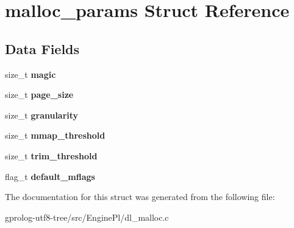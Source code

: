 \hypertarget{structmalloc__params}{}\section{malloc\+\_\+params Struct Reference}
\label{structmalloc__params}
\subsection*{Data Fields}
\begin{DoxyCompactItemize}
\item 
size\+\_\+t {\bfseries magic}\hypertarget{structmalloc__params_a7034fc9c71af2cc5ba9cd079effdf5a8}{}\label{structmalloc__params_a7034fc9c71af2cc5ba9cd079effdf5a8}

\item 
size\+\_\+t {\bfseries page\+\_\+size}\hypertarget{structmalloc__params_a3b7a605d7ebe148a8fb3051465dc3979}{}\label{structmalloc__params_a3b7a605d7ebe148a8fb3051465dc3979}

\item 
size\+\_\+t {\bfseries granularity}\hypertarget{structmalloc__params_aa0609453d9ec826c8ffc632cbfb8cf68}{}\label{structmalloc__params_aa0609453d9ec826c8ffc632cbfb8cf68}

\item 
size\+\_\+t {\bfseries mmap\+\_\+threshold}\hypertarget{structmalloc__params_a5b2af958efc37d52cfa905bc98b41e1b}{}\label{structmalloc__params_a5b2af958efc37d52cfa905bc98b41e1b}

\item 
size\+\_\+t {\bfseries trim\+\_\+threshold}\hypertarget{structmalloc__params_accae9b2bcb4df63efcdc0b18826cc578}{}\label{structmalloc__params_accae9b2bcb4df63efcdc0b18826cc578}

\item 
flag\+\_\+t {\bfseries default\+\_\+mflags}\hypertarget{structmalloc__params_a0bd6b4819a5d7c629c5ab56262f6296d}{}\label{structmalloc__params_a0bd6b4819a5d7c629c5ab56262f6296d}

\end{DoxyCompactItemize}


The documentation for this struct was generated from the following file\+:\begin{DoxyCompactItemize}
\item 
gprolog-\/utf8-\/tree/src/\+Engine\+Pl/dl\+\_\+malloc.\+c\end{DoxyCompactItemize}
